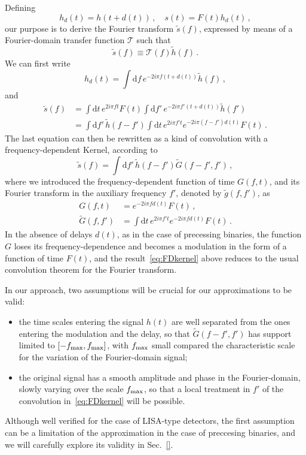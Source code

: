 \documentclass[aps,showpacs,%
prd,superscriptaddress,nofootinbib]{revtex4}
\newcommand{\be}{\begin{equation}}
\newcommand{\ee}{\end{equation}}
\newcommand\ud{{\mathrm{d}}}
\newcommand\calT{{\mathcal{T}}}
\newcommand{\nn}{\nonumber}
\begin{document}
Defining
\be
	h_{d}(t) = h(t+d(t)) \,, \quad s(t) = F(t)h_{d}(t) \,,
\ee
our purpose is to derive the Fourier transform $\tilde{s}(f)$, expressed by means of a Fourier-domain transfer function $\calT$ such that
\be\label{eq:deftransfer}
	\tilde{s}(f) \equiv \calT(f) \tilde{h}(f) \,. 
\ee 
We can first write
\be
	h_{d}(t) = \int \ud f \, e^{-2i\pi f (t+d(t))}\tilde{h}(f) \,,
\ee
and
\begin{align}
	\tilde{s}(f) &= \int \ud t \, e^{2i\pi f t} F(t)  \int \ud f' \, e^{-2i\pi f' (t+d(t))}\tilde{h}(f') \nn\\
	&= \int \ud f' \, \tilde{h}(f-f') \int \ud t \, e^{2i\pi f' t} e^{-2i\pi (f-f') d(t)} F(t) \,.
\end{align}
The last equation can then be rewritten as a kind of convolution with a frequency-dependent Kernel, according to
\be\label{eq:FDkernel}
	\tilde{s}(f) = \int \ud f' \, \tilde{h}(f-f') \tilde{G}(f-f',f') \,,
\ee
where we introduced the frequency-dependent function of time $G(f,t)$, and its Fourier transform in the auxiliary frequency $f'$, denoted by $\tilde{g}(f,f')$, as
\begin{subequations}\label{eq:defg}
\begin{align}
	G(f,t) &= e^{-2i\pi f d(t)} F(t) \,, \\
	\tilde{G}(f,f') &= \int \ud t \, e^{2i\pi f' t} e^{-2i\pi f d(t)} F(t) \,.
\end{align}
\end{subequations}
In the absence of delays $d(t)$, as in the case of precessing binaries, the function $G$ loses its frequency-dependence and becomes a modulation in the form of a function of time $F(t)$, and the result~\eqref{eq:FDkernel} above reduces to the usual convolution theorem for the Fourier transform.

In our approach, two assumptions will be crucial for our approximations to be valid:
\begin{itemize}
	\item the time scales entering the signal $h(t)$ are well separated from the ones entering the modulation and the delay, so that $\tilde{G}(f-f',f')$ has support limited to $[-f_{\rm max},f_{\rm max}]$, with $f_{\rm max}$ small compared the characteristic scale for the variation of the Fourier-domain signal;
	\item the original signal has a smooth amplitude and phase in the Fourier-domain, slowly varying over the scale $f_{\rm max}$, so that a local treatment in $f'$ of the convolution in~\eqref{eq:FDkernel} will be possible.
\end{itemize}
Although well verified for the case of LISA-type detectors, the first assumption can be a limitation of the approximation in the case of preccesing binaries, and we will carefully explore its validity in Sec.~\ref{}.
\end{document}
